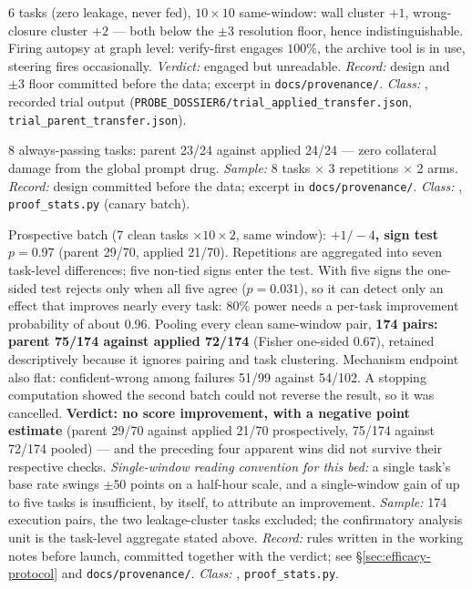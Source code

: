 \begin{description}[leftmargin=0pt,labelindent=0pt,labelsep=0pt,style=nextline,font=\normalfont,itemsep=6pt]
\item[\textbf{F32}\quad Clean-cluster transfer trial.]
6 tasks (zero leakage, never fed), $10 \times 10$ same-window: wall cluster
$+1$, wrong-closure cluster $+2$ --- both below the $\pm 3$ resolution
floor, hence indistinguishable. Firing autopsy at graph level: verify-first
engages $100\%$, the archive tool is in use, steering fires occasionally.
\emph{Verdict:} engaged but unreadable. \emph{Record:} design and $\pm 3$
floor committed before the data; excerpt in \texttt{docs/provenance/}.
\emph{Class:} , recorded
trial output (\texttt{PROBE\_DOSSIER6/trial\_applied\_transfer.json},
\texttt{trial\_parent\_transfer.json}).

\item[\textbf{F33}\quad Canary, for harmlessness.]
8 always-passing tasks: parent 23/24 against applied 24/24 --- zero
collateral damage from the global prompt drug. \emph{Sample:} 8 tasks
$\times$ 3 repetitions $\times$ 2 arms. \emph{Record:} design committed
before the data; excerpt in \texttt{docs/provenance/}. \emph{Class:} ,
\texttt{proof\_stats.py} (canary batch).

\item[\textbf{F34}\quad Efficacy verdict on the pre-specified test.]
Prospective batch (7 clean tasks $\times 10 \times 2$, same window):
\textbf{$+1/-4$, sign test $p = 0.97$} (parent 29/70, applied 21/70).
Repetitions are aggregated into seven task-level differences; five non-tied
signs enter the test. With five signs the one-sided test rejects only when
all five agree ($p = 0.031$), so it can detect only an effect that improves
nearly every task: 80\% power needs a per-task improvement probability of
about $0.96$.
Pooling every clean same-window pair, \textbf{174 pairs: parent 75/174
against applied 72/174} (Fisher one-sided $0.67$), retained descriptively
because it ignores pairing and task clustering. Mechanism endpoint
also flat: confident-wrong among failures 51/99 against 54/102. A stopping
computation showed the second batch could not reverse the result, so it was
cancelled. \textbf{Verdict: no score improvement, with a negative point estimate}
(parent 29/70 against applied 21/70 prospectively, 75/174 against 72/174
pooled) --- and the preceding four apparent wins did not survive their
respective checks. \emph{Single-window reading convention for this bed:} a
single task's base rate swings $\pm 50$ points on a half-hour scale, and a
single-window gain of up to five tasks is insufficient, by itself, to
attribute an improvement. \emph{Sample:} 174 execution pairs, the
two leakage-cluster tasks excluded; the confirmatory analysis unit is the
task-level aggregate stated above. \emph{Record:} rules written in the
working notes before launch, committed together with the verdict; see
\S\ref{sec:efficacy-protocol} and \texttt{docs/provenance/}. \emph{Class:} ,
\texttt{proof\_stats.py}.


\end{description}
